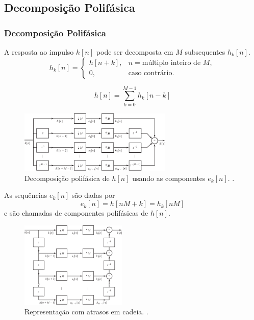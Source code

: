\subsection{Decomposição Polifásica}
\begin{frame}[allowframebreaks]
  \frametitle{Decomposição Polifásica}

  A resposta ao impulso $h[n]$ pode ser decomposta em $M$ subsequentes $h_k[n]$.
  \begin{equation}
   h_k[n] = \begin{cases}
             h[n+k] , & n=\text{múltiplo inteiro de }M, \\
                0,    & \text{caso contrário.}
            \end{cases}
  \end{equation}

  \begin{equation}
   h[n] = \sum_{k=0}^{M-1} h_k [n-k]
  \end{equation}

  \framebreak

        \begin{figure}[h!]
        \centering
        \includegraphics[width=0.65\textwidth]{images/fig435.pdf}
        \caption{Decomposição polifásica de $h[n]$ usando as componentes $e_k[n]$. \citep{oppenheim2009}.}
        \label{fig:fig435}
        \end{figure}
  
  As sequências $e_k[n]$ são dadas por
  \begin{equation}
   e_k[n] = h[nM+k] = h_k[nM]
  \end{equation}
  e são chamadas de componentes polifásicas de $h[n]$.

  \framebreak

        \begin{figure}[h!]
        \centering
        \includegraphics[width=0.45\textwidth]{images/fig436.pdf}
        \caption{Representação com atrasos em cadeia. \citep{oppenheim2009}.}
        \label{fig:fig436}
        \end{figure}


\end{frame}

